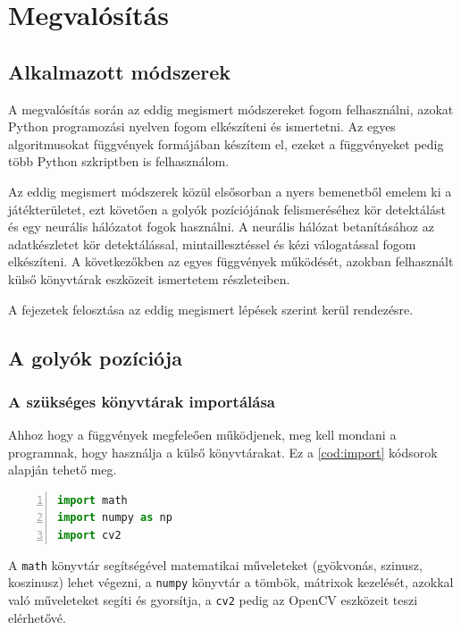 \renewcommand{\lstlistingname}{kódrészlet}

\chapter{Megvalósítás}
\section{Alkalmazott módszerek}
A megvalósítás során az eddig megismert módszereket fogom felhasználni, azokat Python programozási nyelven fogom elkészíteni és ismertetni. Az egyes algoritmusokat függvények formájában készítem el, ezeket a függvényeket pedig több Python szkriptben is felhasználom.
\par Az eddig megismert módszerek közül elsősorban a nyers bemenetből emelem ki a játékterületet, ezt követően a golyók pozíciójának felismeréséhez kör detektálást és egy neurális hálózatot fogok használni. A neurális hálózat betanításához az adatkészletet kör detektálással, mintaillesztéssel és kézi válogatással fogom elkészíteni. A következőkben az egyes függvények működését, azokban felhasznált külső könyvtárak eszközeit ismertetem részleteiben.
\par A fejezetek felosztása az eddig megismert lépések szerint kerül rendezésre.

\section{A golyók pozíciója}

\subsection{A szükséges könyvtárak importálása}
Ahhoz hogy a függvények megfeleően működjenek, meg kell mondani a programnak, hogy használja a külső könyvtárakat.
\newline Ez a \ref{cod:import} kódsorok alapján tehető meg.

\vspace{2mm}
\hspace{-10mm}
\begin{minipage}{\linewidth}
\begin{lstlisting}[language=Python, numbers=left, caption={Könyvtárak importálása.}, label={cod:import}]
import math
import numpy as np
import cv2
\end{lstlisting}
\end{minipage}

\par A \lstinline{math} könyvtár segítségével matematikai műveleteket (gyökvonás, szinusz, koszinusz) lehet végezni, a \lstinline{numpy} könyvtár a tömbök, mátrixok kezelését, azokkal való műveleteket segíti és gyorsítja, a \lstinline{cv2} pedig az OpenCV eszközeit teszi elérhetővé.

